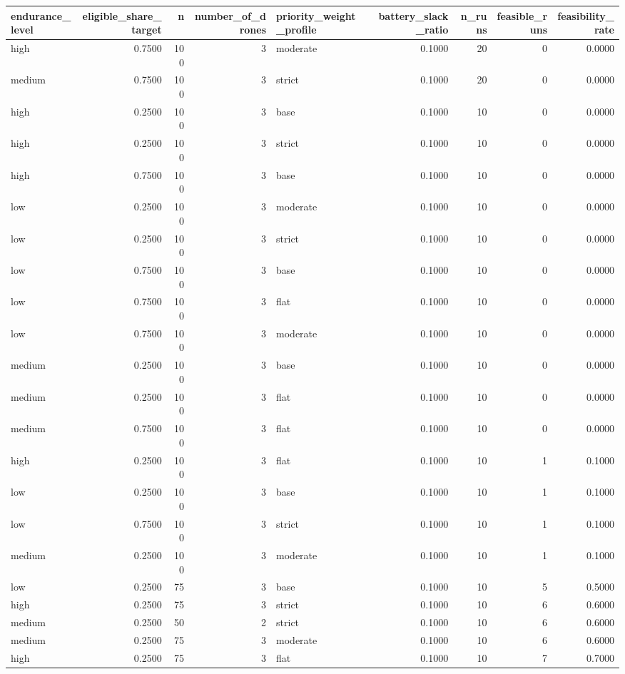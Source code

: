 \begin{tabular}{lrrrlrrrr}
\toprule
endurance_level & eligible_share_target & n & number_of_drones & priority_weight_profile & battery_slack_ratio & n_runs & feasible_runs & feasibility_rate \\
\midrule
high & 0.7500 & 100 & 3 & moderate & 0.1000 & 20 & 0 & 0.0000 \\
medium & 0.7500 & 100 & 3 & strict & 0.1000 & 20 & 0 & 0.0000 \\
high & 0.2500 & 100 & 3 & base & 0.1000 & 10 & 0 & 0.0000 \\
high & 0.2500 & 100 & 3 & strict & 0.1000 & 10 & 0 & 0.0000 \\
high & 0.7500 & 100 & 3 & base & 0.1000 & 10 & 0 & 0.0000 \\
low & 0.2500 & 100 & 3 & moderate & 0.1000 & 10 & 0 & 0.0000 \\
low & 0.2500 & 100 & 3 & strict & 0.1000 & 10 & 0 & 0.0000 \\
low & 0.7500 & 100 & 3 & base & 0.1000 & 10 & 0 & 0.0000 \\
low & 0.7500 & 100 & 3 & flat & 0.1000 & 10 & 0 & 0.0000 \\
low & 0.7500 & 100 & 3 & moderate & 0.1000 & 10 & 0 & 0.0000 \\
medium & 0.2500 & 100 & 3 & base & 0.1000 & 10 & 0 & 0.0000 \\
medium & 0.2500 & 100 & 3 & flat & 0.1000 & 10 & 0 & 0.0000 \\
medium & 0.7500 & 100 & 3 & flat & 0.1000 & 10 & 0 & 0.0000 \\
high & 0.2500 & 100 & 3 & flat & 0.1000 & 10 & 1 & 0.1000 \\
low & 0.2500 & 100 & 3 & base & 0.1000 & 10 & 1 & 0.1000 \\
low & 0.7500 & 100 & 3 & strict & 0.1000 & 10 & 1 & 0.1000 \\
medium & 0.2500 & 100 & 3 & moderate & 0.1000 & 10 & 1 & 0.1000 \\
low & 0.2500 & 75 & 3 & base & 0.1000 & 10 & 5 & 0.5000 \\
high & 0.2500 & 75 & 3 & strict & 0.1000 & 10 & 6 & 0.6000 \\
medium & 0.2500 & 50 & 2 & strict & 0.1000 & 10 & 6 & 0.6000 \\
medium & 0.2500 & 75 & 3 & moderate & 0.1000 & 10 & 6 & 0.6000 \\
high & 0.2500 & 75 & 3 & flat & 0.1000 & 10 & 7 & 0.7000 \\

\end{tabular}
